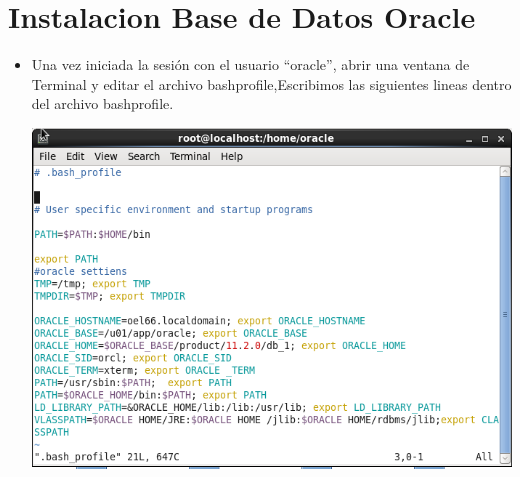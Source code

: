 

\section{Instalacion Base de Datos Oracle} 
\begin{itemize}
	\item Una vez iniciada la sesión con el usuario “oracle”, abrir una ventana de Terminal y editar el archivo
bashprofile,Escribimos las siguientes lineas dentro del archivo bashprofile.
	\begin{center}
	\includegraphics[width=14cm]{./Imagenes/img44} 
	\end{center}
	

\end{itemize}
